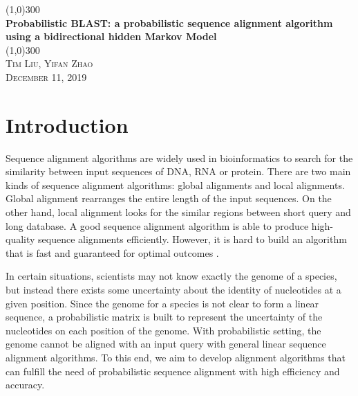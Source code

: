 \documentclass[12pt]{article}
\begin{document}
\begin{titlepage}
	\begin{center}
    \line(1,0){300}\\
    [0.65cm]
	\huge{\bfseries Probabilistic BLAST: a probabilistic sequence alignment algorithm using a bidirectional hidden Markov Model}\\
	\line(1,0){300}\\
	\textsc{\Large Tim Liu, Yifan Zhao}\\
	\textsc{\LARGE December 11, 2019}\\
	[5.5cm]     
	\end{center}

\end{titlepage}

\tableofcontents


\clearpage










\label{Introduction}
\section{Introduction}
Sequence alignment algorithms are widely used in bioinformatics to search for the similarity between input sequences of DNA, RNA or protein. There are two main kinds of sequence alignment algorithms: global alignments and local alignments. Global alignment rearranges the entire length of the input sequences. On the other hand, local alignment looks for the similar regions between short query and long database. A good sequence alignment algorithm is able to produce high-quality sequence alignments efficiently. However, it is hard to build an algorithm that is fast and guaranteed for optimal outcomes \cite{polyanovsky2011}. 

In certain situations, scientists may not know exactly the genome of a species, but instead there exists some uncertainty about the identity of nucleotides at a given position. Since the genome for a species is not clear to form a linear sequence, a probabilistic matrix is built to represent the uncertainty of the nucleotides on each position of the genome. With probabilistic setting, the genome cannot be aligned with an input query with general linear sequence alignment algorithms. To this end, we aim to develop alignment algorithms that can fulfill the need of probabilistic sequence alignment with high efficiency and accuracy. 
\end{document}

